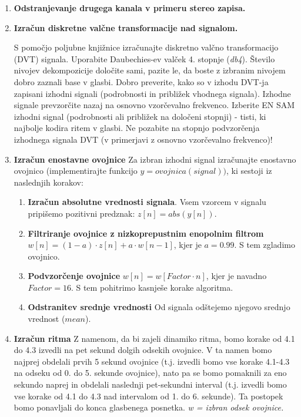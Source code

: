 \documentclass[a4paper,11pt]{article}
\begin{document}
\begin{enumerate}
\item \textbf{Odstranjevanje drugega kanala v primeru stereo zapisa.}

\item \textbf{Izračun diskretne valčne transformacije nad signalom.}

S pomočjo poljubne knjižnice izračunajte diskretno valčno transformacijo (DVT) signala. Uporabite Daubechies-ev valček 4. stopnje (\textit{db4}). Število nivojev dekompozicije določite sami, pazite le, da boste z izbranim nivojem dobro zaznali base v glasbi. Dobro preverite, kako so v izhodu DVT-ja zapisani izhodni signali (podrobnosti in približek vhodnega signala). Izhodne signale prevzorčite nazaj  na osnovno vzorčevalno frekvenco.
Izberite EN SAM izhodni signal (podrobnosti ali približek na določeni stopnji) - tisti, ki najbolje kodira ritem v glasbi. Ne pozabite na stopnjo podvzorčenja  izhodnega signala DVT (v primerjavi z osnovno vzorčevalno frekvenco)! 

\item \textbf{Izračun enostavne ovojnice}
Za izbran izhodni signal izračunajte enostavno ovojnico (implementirajte funkcijo $y=ovojnica(signal))$, ki sestoji iz naslednjih korakov:

	\begin{enumerate}[label*=\arabic*.]
	\item \textbf{Izračun absolutne vrednosti signala}. 
	Vsem vzorcem v signalu pripišemo pozitivni predznak: $z[n] = abs(y[n])$. 
	
	\item \textbf{Filtriranje ovojnice z nizkoprepustnim enopolnim filtrom}
	$w[n] = (1-a)\cdot z[n] + a\cdot w[n-1]$, kjer je $a=0.99$. S tem zgladimo ovojnico.
	
	\item \textbf{Podvzorčenje ovojnice}
	$w[n] = w[Factor \cdot n]$, kjer je navadno $Factor=16$. S tem pohitrimo kasnješe korake algoritma.
	
	\item \textbf{Odstranitev srednje vrednosti}
	Od signala odštejemo njegovo srednjo vrednost ($mean$).

	\end{enumerate}

\item \textbf{Izračun ritma}
Z namenom, da bi zajeli dinamiko ritma, bomo korake od 4.1 do 4.3 izvedli na pet sekund dolgih odsekih ovojnice. V ta namen bomo najprej obdelali prvih 5 sekund ovojnice (t.j. izvedli bomo vse korake 4.1-4.3 na odseku od 0. do 5. sekunde ovojnice), nato pa se bomo  pomaknili za eno sekundo naprej in obdelali naslednji pet-sekundni interval (t.j. izvedli bomo vse korake od 4.1 do 4.3 nad intervalom od 1. do 6. sekunde). Ta postopek bomo ponavljali do konca glasbenega posnetka. \textit{w = izbran odsek ovojnice.}
	

\end{enumerate}
\end{document}
